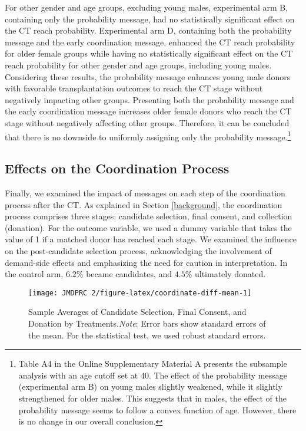 \documentclass[12pt, a4paper]{article}
\begin{document}
For other gender and age groups, excluding young males, experimental arm B, containing only the probability message, had no statistically significant effect on the CT reach probability. Experimental arm D, containing both the probability message and the early coordination message, enhanced the CT reach probability for older female groups while having no statistically significant effect on the CT reach probability for other gender and age groups, including young males. Considering these results, the probability message enhances young male donors with favorable transplantation outcomes to reach the CT stage without negatively impacting other groups. Presenting both the probability message and the early coordination message increases older female donors who reach the CT stage without negatively affecting other groups. Therefore, it can be concluded that there is no downside to uniformly assigning only the probability message.\footnote{Table A4 in the Online Supplementary Material A presents the subsample analysis with an age cutoff set at 40. The effect of the probability message (experimental arm B) on young males slightly weakened, while it slightly strengthened for older males. This suggests that in males, the effect of the probability message seems to follow a convex function of age. However, there is no change in our overall conclusion.}

\hypertarget{process}{%
\subsection{Effects on the Coordination Process}\label{process}}

Finally, we examined the impact of messages on each step of the coordination process after the CT. As explained in Section \ref{background}, the coordination process comprises three stages: candidate selection, final consent, and collection (donation). For the outcome variable, we used a dummy variable that takes the value of 1 if a matched donor has reached each stage. We examined the influence on the post-candidate selection process, acknowledging the involvement of demand-side effects and emphasizing the need for caution in interpretation. In the control arm, \(6.2\)\% became candidates, and \(4.5\)\% ultimately donated.

\begin{figure}[t]
\texttt{[image: JMDPRC~2/figure-latex/coordinate-diff-mean-1]} \caption{Sample Averages of Candidate Selection, Final Consent, and Donation by Treatments.\newline \emph{Note}: Error bars show standard errors of the mean. For the statistical test, we used robust standard errors.}\label{fig:coordinate-diff-mean}
\end{figure}
\end{document}
